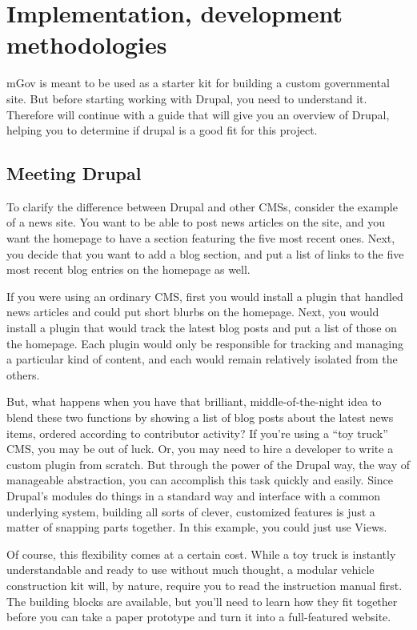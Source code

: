 \section{Implementation, development methodologies}

mGov is meant to be used as a starter kit for building a custom governmental site. But before starting working with Drupal, you need to understand it. Therefore will continue with a guide that will give you an overview of Drupal, helping you to determine if drupal is a good fit for this project.

\subsection{Meeting Drupal}

To clarify the difference between Drupal and other CMSs, consider the example of a news site. You want to be able to post news articles on the site, and you want the homepage to have a section featuring the five most recent ones. Next, you decide that you want to add a blog section, and put a list of links to the five most recent blog entries on the homepage as well.

If you were using an ordinary CMS, first you would install a plugin that handled news articles and could put short blurbs on the homepage. Next, you would install a plugin that would track the latest blog posts and put a list of those on the homepage. Each plugin would only be responsible for tracking and managing a particular kind of content, and each would remain relatively isolated from the others.

But, what happens when you have that brilliant, middle-of-the-night idea to blend these two functions by showing a list of blog posts about the latest news items, ordered according to contributor activity? If you’re using a “toy truck” CMS, you may be out of luck. Or, you may need to hire a developer to write a custom plugin from scratch. But through the power of the Drupal way, the way of manageable abstraction, you can accomplish this task quickly and easily. Since Drupal's modules do things in a standard way and interface with a common underlying system, building all sorts of clever, customized features is just a matter of snapping parts together. In this example, you could just use Views.

Of course, this flexibility comes at a certain cost. While a toy truck is instantly understandable and ready to use without much thought, a modular vehicle construction kit will, by nature, require you to read the instruction manual first. The building blocks are available, but you'll need to learn how they fit together before you can take a paper prototype and turn it into a full-featured website.

